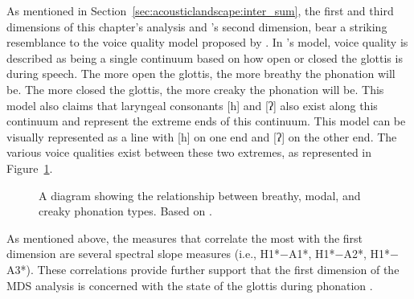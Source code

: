 As mentioned in Section~\ref{sec:acousticlandscape:inter_sum}, the first and third dimensions of this chapter's analysis and \citeauthor{keatingCrosslanguageAcousticSpace2023}'s second dimension, bear a striking resemblance to the voice quality model proposed by \citet{gordonPhonationTypesCrosslinguistic2001}. In \citeauthor{gordonPhonationTypesCrosslinguistic2001}'s model, voice quality is described as being a single continuum based on how open or closed the glottis is during speech. The more open the glottis, the more breathy the phonation will be. The more closed the glottis, the more creaky the phonation will be. This model also claims that laryngeal consonants [h] and [ʔ] also exist along this continuum and represent the extreme ends of this continuum.  This model can be visually represented as a line with [h] on one end and [ʔ] on the other end. The various voice qualities exist between these two extremes, as represented in Figure~\ref{fig:phonation_types_1}.

\begin{figure}[h!]
    \centering
    \caption{A diagram showing the relationship between breathy, modal, and creaky phonation types. Based on \citet{gordonPhonationTypesCrosslinguistic2001}.}
    \label{fig:phonation_types_1}
\end{figure}

As mentioned above, the measures that correlate the most with the first dimension are several spectral slope measures (i.e., H1*$-$A1*, H1*$-$A2*, H1*$-$A3*). These correlations provide further support that the first dimension of the MDS analysis is concerned with the state of the glottis during phonation \citep{holmbergComparisonsAerodynamicElectroglottographic1995,kreimanMeasuresGlottalSource2007,garellekModelingVoiceSource2016,garellekPhoneticsVoice2019,chaiH1H2AcousticMeasure2022}.

